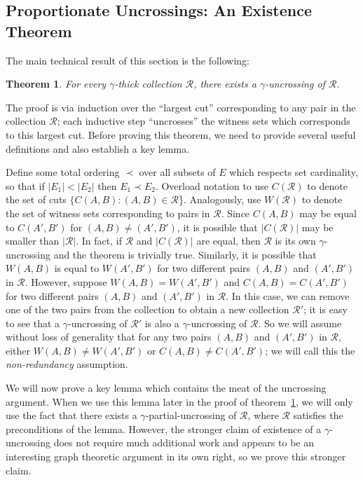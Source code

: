 \documentclass[11pt]{article}
\newtheorem{theorem}{Theorem}[section]
\newcommand{\coll}{{\mathcal R}}
\begin{document}
\subsection{Proportionate Uncrossings: An Existence Theorem}
\label{sec:exists-proportionate}
The main technical result of this section is the following:
\begin{theorem}
\label{thm:uncross}
  For every $\gamma$-thick collection $\coll$, there exists a
  $\gamma$-uncrossing of $\coll$. 
\end{theorem}
The proof is via induction over the ``largest cut'' corresponding to any pair
in the collection $\coll$; each inductive step ``uncrosses'' the witness sets
which corresponds to this largest cut. Before proving this theorem, we need to
provide several useful definitions and also establish a key lemma.

Define some total ordering $\prec$ over all subsets of $E$ which respects set
cardinality, so that if $|E_1| < |E_2|$ then $E_1 \prec E_2$. Overload
notation to use $C(\coll)$ to denote the set of cuts $\{C(A,B) : (A,B) \in
\coll$\}. Analogously, use $W(\coll)$ to denote the set of witness sets
corresponding to pairs in $\coll$. Since $C(A,B)$ may be equal to $C(A',B')$
for $(A,B) \neq (A',B')$, it is possible that $|C(\coll)|$ may be smaller than
$|\coll|$. In fact, if $\coll$ and $|C(\coll)|$ are equal, then $\coll$ is its
own $\gamma$-uncrossing and the theorem is trivially true. Similarly, it is
possible that $W(A,B)$ is equal to $W(A',B')$ for two different pairs $(A,B)$
and $(A',B')$ in $\coll$. However, suppose $W(A,B) = W(A',B')$ and $C(A,B) =
C(A',B')$ for two different pairs $(A,B)$ and $(A',B')$ in $\coll$. In this
case, we can remove one of the two pairs from the collection to obtain a new
collection $\coll'$; it is easy to see that a $\gamma$-uncrossing of $\coll'$
is also a $\gamma$-uncrossing of $\coll$. So we will assume without loss of
generality that for any two pairs $(A,B)$ and $(A',B')$ in $\coll$, either
$W(A,B) \neq W(A',B')$ or $C(A,B) \neq C(A',B')$; we will call this the {\em
  non-redundancy} assumption.

We will now prove a key lemma which contains the meat of the uncrossing
argument. When we use this lemma later in the proof of
theorem~\ref{thm:uncross}, we will only use the fact that there exists a
$\gamma$-partial-uncrossing of $\coll$, where $\coll$ satisfies the
preconditions of the lemma. However, the stronger claim of existence of a
$\gamma$-uncrossing does not require much additional work and appears to be an
interesting graph theoretic argument in its own right, so we prove this
stronger claim.
\end{document}
